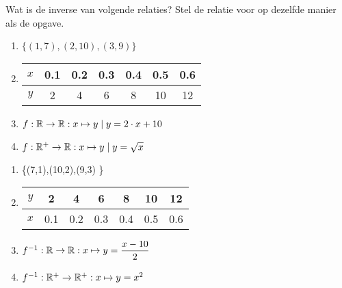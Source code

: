 \begin{oef}
Wat is de inverse van volgende relaties? Stel de relatie voor op dezelfde manier als de opgave.
\begin{enumerate}
  \item $\{(1,7),(2,10),(3,9) \}$
  \item \begin{tabular}{c|cccccc}
          $x$ & \num{0.1} & \num{0.2} & \num{0.3} & \num{0.4} & \num{0.5} & \num{0.6} \\ 
          \midrule
          $y$ & 2 & 4 & 6 & 8 & 10 & 12 \\ 
        \end{tabular} 
  \item $f: \mathbb{R}\rightarrow\mathbb{R}:x\mapsto y \mid y=2\cdot x+10 $
  \item $f: \mathbb{R}^+\rightarrow\mathbb{R}:x\mapsto y \mid y=\sqrt{x}$
\end{enumerate}
\begin{opl}
\begin{enumerate}
  \item \{(7,1),(10,2),(9,3) \}
  \item \begin{tabular}{c|cccccc}
          $y$ & 2 & 4 & 6 & 8 & 10 & 12 \\ 
          \midrule
          $x$ & \num{0.1} & \num{0.2} & \num{0.3} & \num{0.4} & \num{0.5} & \num{0.6} \\ 
        \end{tabular} 
  \item $f^{-1}: \mathbb{R}\rightarrow\mathbb{R}:x\mapsto  y=\dfrac{x-10}{2} $
  \item $f^{-1}: \mathbb{R}^+\rightarrow\mathbb{R}^+:x\mapsto y=x^2$
\end{enumerate}
\end{opl}
\end{oef}



